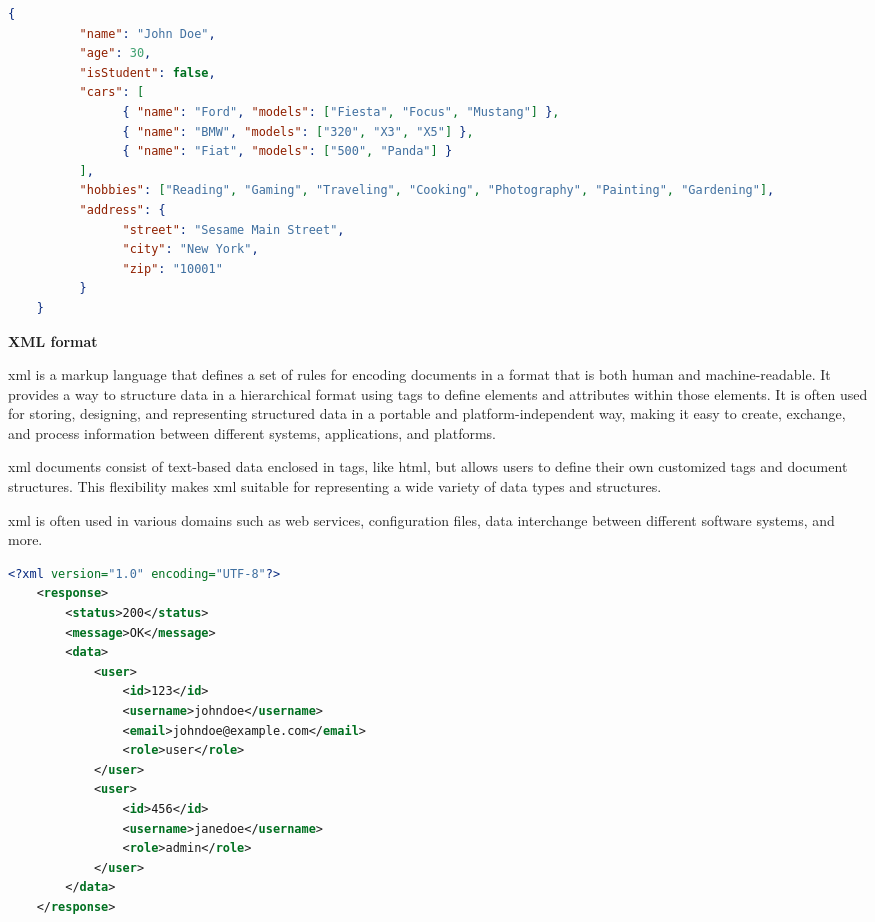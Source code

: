 \begin{lstlisting}[language=JSON, caption=Example of a JSON response, label=lst:jsonresponse]
    {
          "name": "John Doe",
          "age": 30,
          "isStudent": false,
          "cars": [
                { "name": "Ford", "models": ["Fiesta", "Focus", "Mustang"] },
                { "name": "BMW", "models": ["320", "X3", "X5"] },
                { "name": "Fiat", "models": ["500", "Panda"] }
          ],
          "hobbies": ["Reading", "Gaming", "Traveling", "Cooking", "Photography", "Painting", "Gardening"],
          "address": {
                "street": "Sesame Main Street",
                "city": "New York",
                "zip": "10001"
          }
    }
\end{lstlisting}

\begin{multicols}{2}
      \textbf{XML format}

      \acrshort{xml} is a markup language that defines a set of rules for encoding documents in a format that
      is both human and machine-readable. It provides a way to structure data in a hierarchical format using
      tags to define elements and attributes within those elements. It is often used for storing, designing, and
      representing structured data in a portable and platform-independent way, making it easy to create,
      exchange, and process information between different systems, applications, and platforms.

      \acrshort{xml} documents consist of text-based data enclosed in tags, like \acrshort{html}, but
      allows users to define their own customized tags and document structures. This flexibility makes
      \acrshort{xml} suitable for representing a wide variety of data types and structures.

      \acrshort{xml} is often used in various domains such as web services, configuration files, data
      interchange between different software systems, and more.
\end{multicols}

\begin{lstlisting}[language=XML, caption=Example of a XML response, label=lst:xmlresponse]
    <?xml version="1.0" encoding="UTF-8"?>
    <response>
        <status>200</status>
        <message>OK</message>
        <data>
            <user>
                <id>123</id>
                <username>johndoe</username>
                <email>johndoe@example.com</email>
                <role>user</role>
            </user>
            <user>
                <id>456</id>
                <username>janedoe</username>
                <role>admin</role>
            </user>
        </data>
    </response>
\end{lstlisting}

